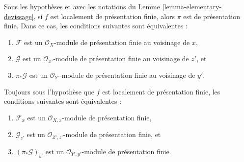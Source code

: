 \begin{lemma}
\label{lemma-devissage-finite-presentation}
Sous les hypothèses et avec les notations du
Lemme \ref{lemma-elementary-devissage},
si $f$ est localement de présentation finie,
alors $\pi$ est de présentation finie.
Dans ce cas, les conditions suivantes sont équivalentes :
\begin{enumerate}
\item $\mathcal{F}$ est un $\mathcal{O}_X$-module de présentation finie
au voisinage de $x$,
\item $\mathcal{G}$ est un $\mathcal{O}_{Z'}$-module de présentation finie
au voisinage de $z'$, et
\item $\pi_*\mathcal{G}$ est un $\mathcal{O}_{Y'}$-module
de présentation finie au voisinage de $y'$.
\end{enumerate}
Toujours sous l'hypothèse que $f$ est localement de présentation finie, les conditions
suivantes sont équivalentes :
\begin{enumerate}
\item[(a)] $\mathcal{F}_x$ est un $\mathcal{O}_{X, x}$-module de présentation
finie,
\item[(b)] $\mathcal{G}_{z'}$ est un $\mathcal{O}_{Z', z'}$-module
de présentation finie, et
\item[(c)] $(\pi_*\mathcal{G})_{y'}$ est un $\mathcal{O}_{Y', y'}$-module
de présentation finie.
\end{enumerate}
\end{lemma}

